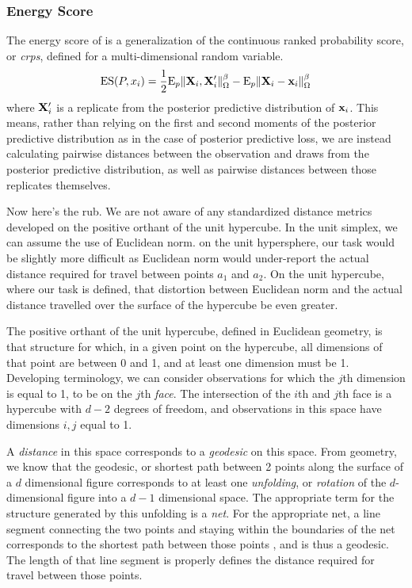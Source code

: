 \subsubsection{Energy Score}
The energy score of \cite{gneiting2007} is a generalization of the continuous ranked probability
  score, or \emph{crps}, defined for a multi-dimensional random variable.
  \begin{equation}
    \label{eq:es}
    \text{ES}(P,x_i) = \frac{1}{2}\text{E}_p\lVert {\bf X}_i,{\bf X}_i^{\prime}\rVert_{\Omega}^{\beta} -
                            \text{E}_p\lVert {\bf X}_i - {\bf x}_i\rVert_{\Omega}^{\beta}
  \end{equation}
  where ${\bf X}_i^{\prime}$ is a replicate from the posterior predictive distribution
  of ${\bf x}_i$. This means, rather than relying on the first and second moments of the posterior
  predictive distribution as in the case of posterior predictive loss\cite{gelfand1998}, we are
  instead calculating pairwise distances between the observation and draws from the posterior
  predictive distribution, as well as pairwise distances between those replicates themselves.

Now here's the rub.  We are not aware of any standardized distance metrics developed on the
  positive orthant of the unit hypercube.  In the unit simplex, we can assume the use of
  Euclidean norm.  on the unit hypersphere, our task would be slightly more difficult as
  Euclidean norm would under-report the actual distance required for travel between points $a_1$
  and $a_2$.  On the unit hypercube, where our task is defined, that distortion between Euclidean
  norm and the actual distance travelled over the surface of the hypercube be even greater.

The positive orthant of the unit hypercube, defined in Euclidean geometry, is that structure for
  which, in a given point on the hypercube, all dimensions of that point are between 0 and 1, and
  at least one dimension must be 1.  Developing terminology, we can consider observations for which
  the $j$th dimension is equal to 1, to be on the $j$th \emph{face}.  The intersection of the $i$th
  and $j$th face is a hypercube with $d-2$ degrees of freedom, and observations in this space have
  dimensions $i,j$ equal to 1.

A \emph{distance} in this space corresponds to a \emph{geodesic} on this space. From geometry, we
  know that the geodesic, or shortest path between 2 points along the surface of a $d$ dimensional
  figure corresponds to at least one \emph{unfolding}, or \emph{rotation} of the $d$-dimensional
  figure into a $d-1$ dimensional space.  The appropriate term for the structure generated by this
  unfolding is a \emph{net}.  For the appropriate net, a line segment connecting the two points and
  staying within the boundaries of the net corresponds to the shortest path between those points
  , and is thus a geodesic.  The length of that line segment is properly
  defines the distance required for travel between those points.

